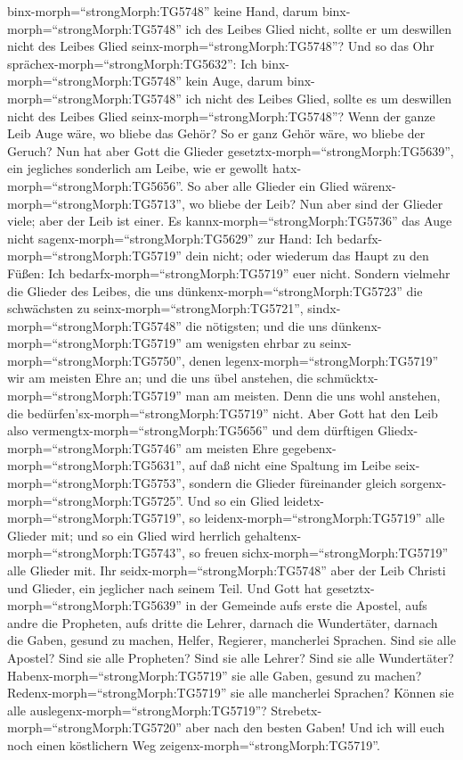 binx-morph=``strongMorph:TG5748'' keine Hand, darum
binx-morph=``strongMorph:TG5748'' ich des Leibes Glied nicht, sollte er
um deswillen nicht des Leibes Glied seinx-morph=``strongMorph:TG5748''?
 Und so das Ohr sprächex-morph=``strongMorph:TG5632'': Ich
binx-morph=``strongMorph:TG5748'' kein Auge, darum
binx-morph=``strongMorph:TG5748'' ich nicht des Leibes Glied, sollte es
um deswillen nicht des Leibes Glied seinx-morph=``strongMorph:TG5748''?
 Wenn der ganze Leib Auge wäre, wo bliebe das Gehör? So er
ganz Gehör wäre, wo bliebe der Geruch?  Nun hat aber Gott
die Glieder gesetztx-morph=``strongMorph:TG5639'', ein jegliches
sonderlich am Leibe, wie er gewollt hatx-morph=``strongMorph:TG5656''.
 So aber alle Glieder ein Glied
wärenx-morph=``strongMorph:TG5713'', wo bliebe der Leib? 
Nun aber sind der Glieder viele; aber der Leib ist einer. 
Es kannx-morph=``strongMorph:TG5736'' das Auge nicht
sagenx-morph=``strongMorph:TG5629'' zur Hand: Ich
bedarfx-morph=``strongMorph:TG5719'' dein nicht; oder wiederum das Haupt
zu den Füßen: Ich bedarfx-morph=``strongMorph:TG5719'' euer nicht.
 Sondern vielmehr die Glieder des Leibes, die uns
dünkenx-morph=``strongMorph:TG5723'' die schwächsten zu
seinx-morph=``strongMorph:TG5721'', sindx-morph=``strongMorph:TG5748''
die nötigsten;  und die uns
dünkenx-morph=``strongMorph:TG5719'' am wenigsten ehrbar zu
seinx-morph=``strongMorph:TG5750'', denen
legenx-morph=``strongMorph:TG5719'' wir am meisten Ehre an; und die uns
übel anstehen, die schmücktx-morph=``strongMorph:TG5719'' man am
meisten.  Denn die uns wohl anstehen, die
bedürfen'sx-morph=``strongMorph:TG5719'' nicht. Aber Gott hat den Leib
also vermengtx-morph=``strongMorph:TG5656'' und dem dürftigen
Gliedx-morph=``strongMorph:TG5746'' am meisten Ehre
gegebenx-morph=``strongMorph:TG5631'',  auf daß nicht eine
Spaltung im Leibe seix-morph=``strongMorph:TG5753'', sondern die Glieder
füreinander gleich sorgenx-morph=``strongMorph:TG5725''. 
Und so ein Glied leidetx-morph=``strongMorph:TG5719'', so
leidenx-morph=``strongMorph:TG5719'' alle Glieder mit; und so ein Glied
wird herrlich gehaltenx-morph=``strongMorph:TG5743'', so freuen
sichx-morph=``strongMorph:TG5719'' alle Glieder mit.  Ihr
seidx-morph=``strongMorph:TG5748'' aber der Leib Christi und Glieder,
ein jeglicher nach seinem Teil.  Und Gott hat
gesetztx-morph=``strongMorph:TG5639'' in der Gemeinde aufs erste die
Apostel, aufs andre die Propheten, aufs dritte die Lehrer, darnach die
Wundertäter, darnach die Gaben, gesund zu machen, Helfer, Regierer,
mancherlei Sprachen.  Sind sie alle Apostel? Sind sie alle
Propheten? Sind sie alle Lehrer? Sind sie alle Wundertäter?
 Habenx-morph=``strongMorph:TG5719'' sie alle Gaben, gesund
zu machen? Redenx-morph=``strongMorph:TG5719'' sie alle mancherlei
Sprachen? Können sie alle auslegenx-morph=``strongMorph:TG5719''?
 Strebetx-morph=``strongMorph:TG5720'' aber nach den besten
Gaben! Und ich will euch noch einen köstlichern Weg
zeigenx-morph=``strongMorph:TG5719''.

